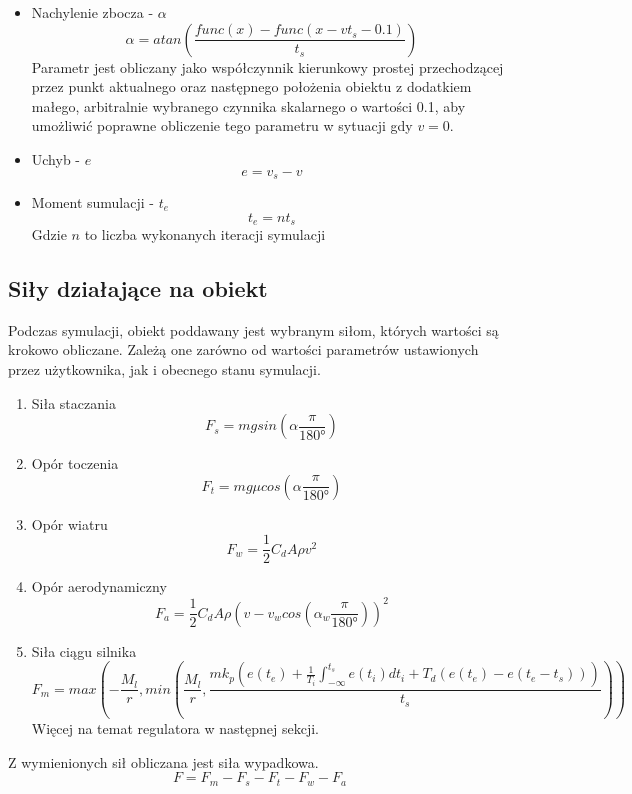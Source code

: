 \documentclass[12pt,a4paper]{article}
\begin{document}
	\begin{itemize}
		\item Nachylenie zbocza - $\alpha$ \\
		\[
		\alpha = atan \left( \frac{func(x) - func(x - vt_s - 0.1)}{t_s} \right)
		\]
		Parametr jest obliczany jako współczynnik kierunkowy prostej przechodzącej przez punkt aktualnego oraz następnego położenia obiektu z dodatkiem małego, arbitralnie wybranego czynnika skalarnego o wartości 0.1, aby umożliwić poprawne obliczenie tego parametru w sytuacji gdy $v = 0$.
		\item Uchyb - $e$
		\[
			e = v_s - v
		\]
		\item Moment sumulacji - $t_e$
		\[
			t_e = n t_s
		\]
		Gdzie $n$ to liczba wykonanych iteracji symulacji
	\end{itemize}
	
	\subsection{Siły działające na obiekt}
	Podczas symulacji, obiekt poddawany jest wybranym siłom, których wartości są krokowo obliczane. Zależą one zarówno od wartości parametrów ustawionych przez użytkownika, jak i obecnego stanu symulacji.
	\begin{enumerate}
		\item Siła staczania
		\[
			F_s = mgsin\left(\alpha\frac{\pi}{180°}\right)
		\]
		\item Opór toczenia
		\[
			F_t = mg\mu cos\left(\alpha\frac{\pi}{180°}\right)
		\]
		\item Opór wiatru
		\[
			F_w = \frac{1}{2} C_d A \rho v^2
		\]
		\item Opór aerodynamiczny
		\[
			F_a = \frac{1}{2} C_d A \rho (v - v_wcos(\alpha_w\frac{\pi}{180°}))^2
		\]
		\item Siła ciągu silnika
		\[
			F_m = max\left(-\frac{M_l}{r} ,min\left(\frac{M_l}{r}, \frac{mk_p\left(e(t_e) + \frac{1}{T_i}\int_{-\infty}^{t_s}e(t_i)dt_i + T_d(e(t_e) - e(t_e - t_s))\right)}{t_s}\right)\right)
		\]
		Więcej na temat regulatora w następnej sekcji.
	\end{enumerate}
	Z wymienionych sił obliczana jest siła wypadkowa.
	\[
		F = F_m - F_s - F_t - F_w - F_a
	\]
\end{document}
